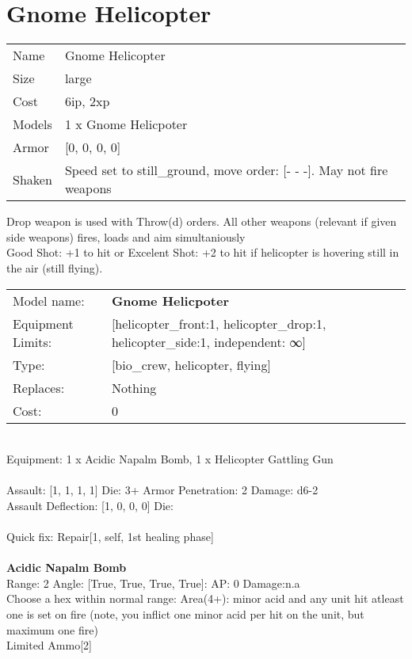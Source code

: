 \pagebreak

\section{ Gnome Helicopter }

\begin{tabular}{ll}
  Name & Gnome Helicopter \\
  Size & large\\
  Cost & 6ip, 2xp\\
  Models & 1 x Gnome Helicpoter\\
  Armor & [0, 0, 0, 0]\\
  Shaken & Speed set to still_ground, move order: [- - -]. May not fire weapons\\
\end{tabular}

\noindent Drop weapon is used with Throw(d) orders. All other weapons (relevant if given side weapons) fires, loads and aim simultaniously\\ 
Good Shot: +1 to hit or Excelent Shot: +2 to hit if helicopter is hovering still in the air (still flying).\\ 


\noindent
\begin{tabular}{ll}
Model name: &{\bf Gnome Helicpoter } \\
Equipment Limits: &[helicopter_front:1, helicopter_drop:1, helicopter_side:1, independent: ∞] \\
Type: &[bio_crew, helicopter, flying] \\
Replaces: &Nothing \\
Cost: & 0\\
\end{tabular}
\ \\
Equipment: 1 x Acidic Napalm Bomb, 1 x Helicopter Gattling Gun \\
\ \\
Assault: [1, 1, 1, 1] Die: 3+ Armor Penetration: 2 Damage: d6-2 \\
Assault Deflection: [1, 0, 0, 0] Die: \\
\indent  
\ \\
Quick fix: Repair[1, self, 1st healing phase]\\ 

\ \\
{\bf Acidic Napalm Bomb } \\



Range: 2  Angle: [True, True, True, True]: AP: 0 Damage:n.a \\
Choose a hex within normal range: Area(4+): minor acid and any unit hit atleast one is set on fire (note, you inflict one minor acid per hit on the unit, but maximum one fire)\\ 
Limited Ammo[2]\\ 




